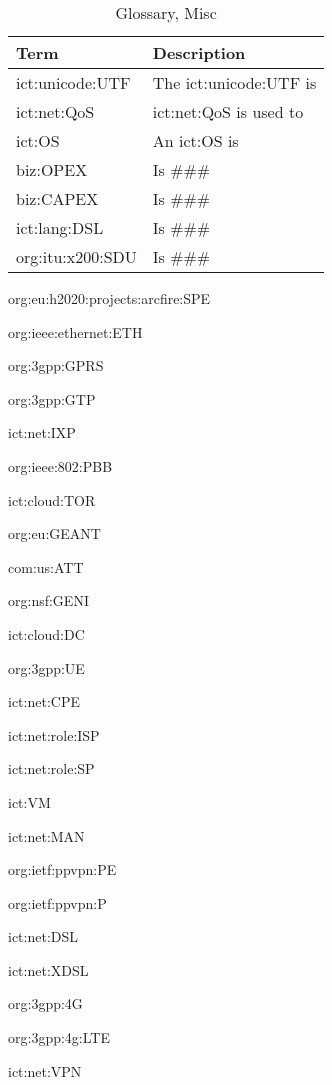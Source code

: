 \begin{table}[H]
    \caption{Glossary, Misc}
    \label{tab:glossary:misc}
    \centering
    \begin{tabular}{p{} p{}}
        \toprule
        \textbf{Term} & \textbf{Description}\\
        \toprule

        \acs{ict:unicode:UTF} &
        The \acl{ict:unicode:UTF} is
        \\

        \acs{ict:net:QoS} &
        \acl{ict:net:QoS} is used to
        \\

        \acs{ict:OS} &
        An \acl{ict:OS} is
        \\

        \acs{biz:OPEX} &
        Is \#\#\#
        \\

        \acs{biz:CAPEX} &
        Is \#\#\#
        \\

        \acs{ict:lang:DSL} &
        Is \#\#\#
        \\

        \acs{org:itu:x200:SDU} &
        Is \#\#\#
        \\


        \toprule
    \end{tabular}
\end{table}


\acs{org:eu:h2020:projects:arcfire:SPE}

\acs{org:ieee:ethernet:ETH}

\acs{org:3gpp:GPRS}

\acs{org:3gpp:GTP}

\acs{ict:net:IXP}

\acs{org:ieee:802:PBB}

\acs{ict:cloud:TOR}

\acs{org:eu:GEANT}

\acs{com:us:ATT}

\acs{org:nsf:GENI}

\acs{ict:cloud:DC}

\acs{org:3gpp:UE}

\acs{ict:net:CPE}

\acs{ict:net:role:ISP}

\acs{ict:net:role:SP}

\acs{ict:VM}


\acs{ict:net:MAN}

\acs{org:ietf:ppvpn:PE}

\acs{org:ietf:ppvpn:P}


\acs{ict:net:DSL}

\acs{ict:net:XDSL}


\acs{org:3gpp:4G}

\acs{org:3gpp:4g:LTE}

\acs{ict:net:VPN}






